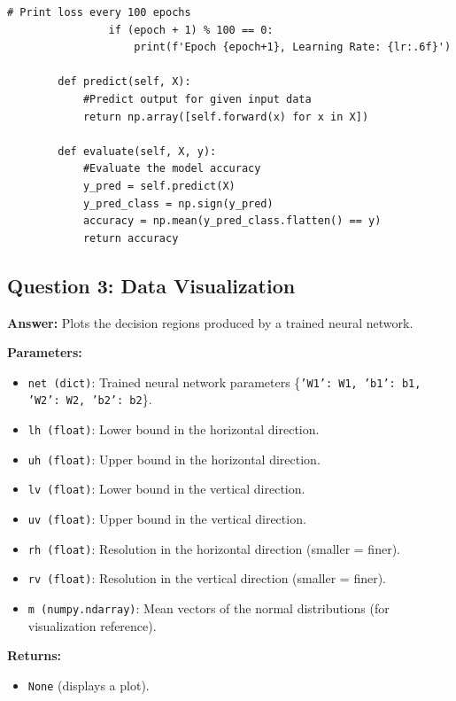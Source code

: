 \documentclass[a4paper,12pt]{article}
\begin{document}
\begin{lstlisting}[style=python]
                # Print loss every 100 epochs
                if (epoch + 1) % 100 == 0:
                    print(f'Epoch {epoch+1}, Learning Rate: {lr:.6f}')
    
        def predict(self, X):
            #Predict output for given input data
            return np.array([self.forward(x) for x in X])
    
        def evaluate(self, X, y):
            #Evaluate the model accuracy
            y_pred = self.predict(X)
            y_pred_class = np.sign(y_pred)  
            accuracy = np.mean(y_pred_class.flatten() == y)  
            return accuracy
    \end{lstlisting}

\newpage
\subsection{Question 3: Data Visualization}
\textbf{Answer:}
Plots the decision regions produced by a trained neural network.

\textbf{Parameters:}
\begin{itemize}
    \item \texttt{net (dict)}: Trained neural network parameters \{\texttt{'W1': W1, 'b1': b1, 'W2': W2, 'b2': b2}\}.
    \item \texttt{lh (float)}: Lower bound in the horizontal direction.
    \item \texttt{uh (float)}: Upper bound in the horizontal direction.
    \item \texttt{lv (float)}: Lower bound in the vertical direction.
    \item \texttt{uv (float)}: Upper bound in the vertical direction.
    \item \texttt{rh (float)}: Resolution in the horizontal direction (smaller = finer).
    \item \texttt{rv (float)}: Resolution in the vertical direction (smaller = finer).
    \item \texttt{m (numpy.ndarray)}: Mean vectors of the normal distributions (for visualization reference).
\end{itemize}

\textbf{Returns:}
\begin{itemize}
    \item \texttt{None} (displays a plot).
\end{itemize}
\end{document}

